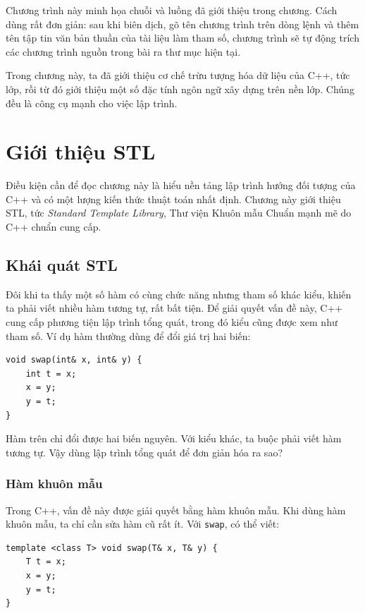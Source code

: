 \documentclass[11pt]{article}
\newcommand{\cpp}{C++}
\begin{document}
Chương trình này minh họa chuỗi và luồng đã giới thiệu trong chương. Cách
dùng rất đơn giản: sau khi biên dịch, gõ tên chương trình trên dòng lệnh và
thêm tên tập tin văn bản thuần của tài liệu làm tham số, chương trình sẽ tự
động trích các chương trình nguồn trong bài ra thư mục hiện tại.

Trong chương này, ta đã giới thiệu cơ chế trừu tượng hóa dữ liệu của \cpp{},
tức lớp, rồi từ đó giới thiệu một số đặc tính ngôn ngữ xây dựng trên nền lớp.
Chúng đều là công cụ mạnh cho việc lập trình.

\section{Giới thiệu STL}

Điều kiện cần để đọc chương này là hiểu nền tảng lập trình hướng đối tượng
của \cpp{} và có một lượng kiến thức thuật toán nhất định. Chương này giới
thiệu STL, tức \emph{Standard Template Library}, Thư viện Khuôn mẫu Chuẩn
mạnh mẽ do \cpp{} chuẩn cung cấp.

\subsection{Khái quát STL}

Đôi khi ta thấy một số hàm có cùng chức năng nhưng tham số khác kiểu, khiến
ta phải viết nhiều hàm tương tự, rất bất tiện. Để giải quyết vấn đề này,
\cpp{} cung cấp phương tiện lập trình tổng quát, trong đó kiểu cũng được xem
như tham số. Ví dụ hàm thường dùng để đổi giá trị hai biến:

\begin{verbatim}
void swap(int& x, int& y) {
    int t = x;
    x = y;
    y = t;
}
\end{verbatim}

Hàm trên chỉ đổi được hai biến nguyên. Với kiểu khác, ta buộc phải viết hàm
tương tự. Vậy dùng lập trình tổng quát để đơn giản hóa ra sao?

\subsubsection*{Hàm khuôn mẫu}

Trong \cpp{}, vấn đề này được giải quyết bằng hàm khuôn mẫu. Khi dùng hàm
khuôn mẫu, ta chỉ cần sửa hàm cũ rất ít. Với \verb|swap|, có thể viết:

\begin{verbatim}
template <class T> void swap(T& x, T& y) {
    T t = x;
    x = y;
    y = t;
}
\end{verbatim}
\end{document}

